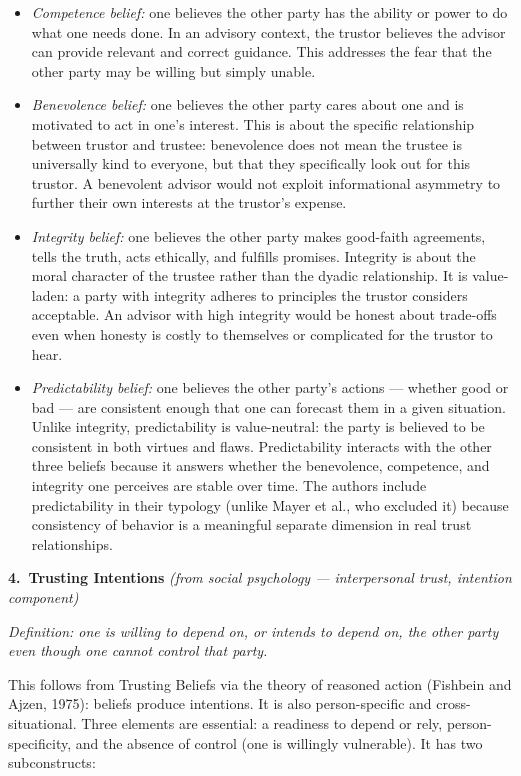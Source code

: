 \documentclass[11pt, a4paper]{article}
\begin{document}
\begin{itemize}[leftmargin=2em]
  \item \textit{Competence belief:} one believes the other party has the ability or power to do what one needs done. In an advisory context, the trustor believes the advisor can provide relevant and correct guidance. This addresses the fear that the other party may be willing but simply unable.
  \item \textit{Benevolence belief:} one believes the other party cares about one and is motivated to act in one's interest. This is about the specific relationship between trustor and trustee: benevolence does not mean the trustee is universally kind to everyone, but that they specifically look out for this trustor. A benevolent advisor would not exploit informational asymmetry to further their own interests at the trustor's expense.
  \item \textit{Integrity belief:} one believes the other party makes good-faith agreements, tells the truth, acts ethically, and fulfills promises. Integrity is about the moral character of the trustee rather than the dyadic relationship. It is value-laden: a party with integrity adheres to principles the trustor considers acceptable. An advisor with high integrity would be honest about trade-offs even when honesty is costly to themselves or complicated for the trustor to hear.
  \item \textit{Predictability belief:} one believes the other party's actions --- whether good or bad --- are consistent enough that one can forecast them in a given situation. Unlike integrity, predictability is value-neutral: the party is believed to be consistent in both virtues and flaws. Predictability interacts with the other three beliefs because it answers whether the benevolence, competence, and integrity one perceives are stable over time. The authors include predictability in their typology (unlike Mayer et al., who excluded it) because consistency of behavior is a meaningful separate dimension in real trust relationships.
\end{itemize}

\bigskip
\noindent\textbf{4.\ Trusting Intentions} \hfill \textit{(from social psychology --- interpersonal trust, intention component)}

\textit{Definition: one is willing to depend on, or intends to depend on, the other party even though one cannot control that party.}

This follows from Trusting Beliefs via the theory of reasoned action (Fishbein and Ajzen, 1975): beliefs produce intentions. It is also person-specific and cross-situational. Three elements are essential: a readiness to depend or rely, person-specificity, and the absence of control (one is willingly vulnerable). It has two subconstructs:
\end{document}
